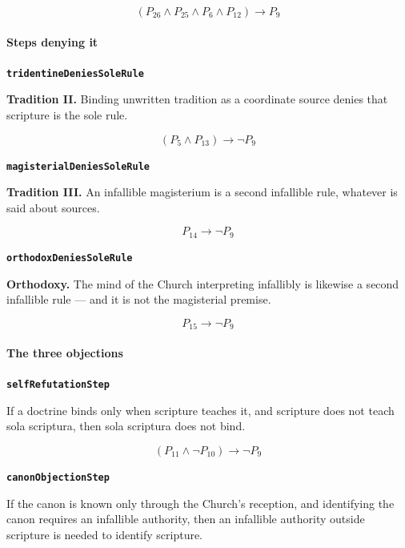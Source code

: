 \documentclass[11pt]{article}
\begin{document}
\[(P_{26} \land P_{25} \land P_{6} \land P_{12}) \rightarrow P_{9}\]
\paragraph*{Steps denying it}
\leavevmode\par
\par\medskip\noindent\textbf{\texttt{tridentine\allowbreak{}Denies\allowbreak{}Sole\allowbreak{}Rule}}\par\nobreak\noindent
\textbf{Tradition II.} Binding unwritten tradition as a coordinate source denies that scripture is the sole rule.

\[(P_{5} \land P_{13}) \rightarrow \lnot P_{9}\]
\par\medskip\noindent\textbf{\texttt{magisterial\allowbreak{}Denies\allowbreak{}Sole\allowbreak{}Rule}}\par\nobreak\noindent
\textbf{Tradition III.} An infallible magisterium is a second infallible rule, whatever is said about sources.

\[P_{14} \rightarrow \lnot P_{9}\]
\par\medskip\noindent\textbf{\texttt{orthodox\allowbreak{}Denies\allowbreak{}Sole\allowbreak{}Rule}}\par\nobreak\noindent
\textbf{Orthodoxy.} The mind of the Church interpreting infallibly is likewise a second infallible rule — and it is not the magisterial premise.

\[P_{15} \rightarrow \lnot P_{9}\]
\paragraph*{The three objections}
\leavevmode\par
\par\medskip\noindent\textbf{\texttt{self\allowbreak{}Refutation\allowbreak{}Step}}\par\nobreak\noindent
If a doctrine binds only when scripture teaches it, and scripture does not teach sola scriptura, then sola scriptura does not bind.

\[(P_{11} \land \lnot P_{10}) \rightarrow \lnot P_{9}\]
\par\medskip\noindent\textbf{\texttt{canon\allowbreak{}Objection\allowbreak{}Step}}\par\nobreak\noindent
If the canon is known only through the Church's reception, and identifying the canon requires an infallible authority, then an infallible authority outside scripture is needed to identify scripture.
\end{document}
